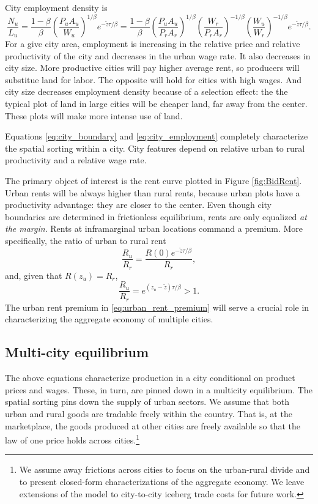 \documentclass[12pt]{article}
\begin{document}
City employment density is
\begin{equation}\label{eq:city_employment}
\frac{N_u}{L_u} = \frac{1-\beta}{\beta} \left(\frac{P_uA_u}{W_u}\right)^{1/\beta} e^{-\tilde z\tau/\beta}
=\frac{1-\beta}{\beta} 
	 \left(\frac{P_uA_u}{P_rA_r}\right)^{1/\beta} 
	 \left(\frac{W_r}{P_rA_r}\right)^{-1/\beta} 
	 \left(\frac{W_u}{W_r}\right)^{-1/\beta} 
	 e^{-\tilde z{\tau/\beta}}.
\end{equation}
For a give city area, employment is increasing in the relative price and relative productivity of the city and decreases in the urban wage rate. It also decreases in city size. More productive cities will pay higher average rent, so producers will substitue land for labor. The opposite will hold for cities with high wages. And city size decreases employment density because of a selection effect: the the typical plot of land in large cities will be cheaper land, far away from the center. These plots will make more intense use of land.

Equations \eqref{eq:city_boundary} and \eqref{eq:city_employment} completely characterize the spatial sorting within a city. City features depend on relative urban to rural productivity and a relative wage rate.

The primary object of interest is the rent curve plotted in Figure \ref{fig:BidRent}. Urban rents will be always higher than rural rents, because urban plots have a productivity advantage: they are closer to the center. Even though city boundaries are determined in frictionless equilibrium, rents are only equalized \emph{at the margin}. Rents at inframarginal urban locations command a premium. More specifically, 
the ratio of urban to rural rent
\[
\frac{R_u}{R_r} = \frac{R(0)e^{-\tilde z \tau /\beta}} {R_r},
\]
and, given that $R(z_u)=R_r$, 
\begin{equation}\label{eq:urban_rent_premium}
\frac{R_u}{R_r} = e^{(z_u-\tilde z) \tau /\beta}>1.
\end{equation}
The urban rent premium in \eqref{eq:urban_rent_premium} will serve a crucial role in characterizing the aggregate economy of multiple cities.

\subsection{Multi-city equilibrium}
The above equations characterize production in a city conditional on product prices and wages. These, in turn, are pinned down in a multicity equilibrium. The spatial sorting pins down the supply of urban sectors. We assume that both urban and rural goods are tradable freely within the country. That is, at the marketplace, the goods produced at other cities are freely available so that the law of one price holds across cities.\footnote{We assume away frictions across cities to focus on the urban-rural divide and to present closed-form characterizations of the aggregate economy. We leave extensions of the model to city-to-city iceberg trade costs for future work.}
\end{document}
